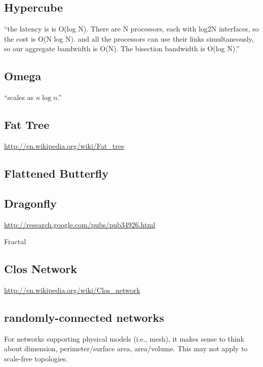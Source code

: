 \documentclass[pdftex]{article}
\begin{document}
\subsection{Hypercube}

``the latency is is O(log N). There are N processors, each with log2N interfaces, so the cost is O(N log N). and all the processors can use their links simultaneously, so our aggregate bandwidth is O(N). The bisection bandwidth is O(log N).''

\subsection{Omega}

``scales as $n \log n$.''

\subsection{Fat Tree}

\href{http://en.wikipedia.org/wiki/Fat_tree}{http://en.wikipedia.org/wiki/Fat\_tree}

\subsection{Flattened Butterfly}

\subsection{Dragonfly}

\href{http://research.google.com/pubs/pub34926.html}{http://research.google.com/pubs/pub34926.html}

Fractal

\subsection{Clos Network}

\href{http://en.wikipedia.org/wiki/Clos_network}{http://en.wikipedia.org/wiki/Clos\_network}

\subsection{randomly-connected networks}

For networks supporting physical models (i.e., mesh), it makes sense to think about dimension, perimeter/surface area, area/volume. This may not apply to scale-free topologies. 
\end{document}
